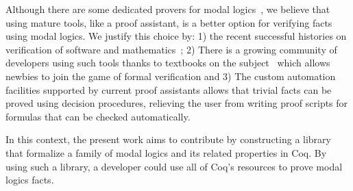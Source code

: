 \documentclass[sigconf]{acmart}
\begin{document}
Although there are some dedicated provers for modal logics~\cite{Gleissner17,Mora11},
we believe that using mature tools, like a proof assistant, is a better option for
verifying facts using modal logics. We justify this choice by: 1) the recent
successful histories on verification of software and
mathematics~\cite{Leroy09,Klein10,Gonthier13,Gonthier08}; 2) There is a growing
community of developers using such tools thanks to 
textbooks on the subject~\cite{Nipkow14,Bertot10,Chlipala13} which allows
newbies to join the game of formal verification and 3) The custom automation
facilities supported by current proof assistants allows that trivial facts can
be proved using decision procedures, relieving the user from writing proof
scripts for formulas that can be checked automatically.

In this context, the present work aims to contribute by constructing a library
that formalize a family of modal logics and its related properties in Coq.
By using such a library, a developer could use all of Coq's resources to prove
modal logics facts.



\end{document}
